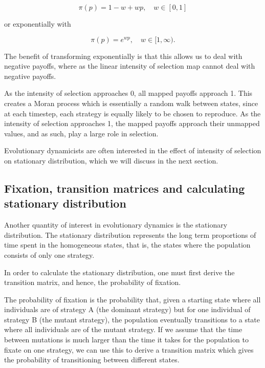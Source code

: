 \begin{equation*}
    \pi(p) = 1 - w + wp, \quad w \in [0,1]
\end{equation*}

or exponentially with

\begin{equation*}
    \pi(p) = e^{wp}, \quad w \in [1, \infty).
\end{equation*}

The benefit of transforming exponentially is that this allows us to deal with negative payoffs, where as the linear intensity of selection map cannot deal with negative payoffs.

As the intensity of selection approaches 0, all mapped payoffs approach 1.
This creates a Moran process which is essentially a random walk between states, since at each timestep, each strategy is equally likely to be chosen to reproduce.
As the intensity of selection approaches 1, the mapped payoffs approach their unmapped values, and as such, play a large role in selection.

Evolutionary dynamicists are often interested in the effect of intensity of selection on stationary distribution, which we will discuss in the next section.

\subsection{Fixation, transition matrices and calculating stationary distribution}

Another quantity of interest in evolutionary dynamics is the stationary distribution.
The stationary distribution represents the long term proportions of time spent in the homogeneous states, that is, the states where the population consists of only one strategy.

In order to calculate the stationary distribution, one must first derive the transition matrix, and hence, the probability of fixation.

The probability of fixation is the probability that, given a starting state where all individuals are of strategy A (the dominant strategy) but for one individual of strategy B (the mutant strategy), the population eventually transitions to a state where all individuals are of the mutant strategy.
If we assume that the time between mutations is much larger than the time it takes for the population to fixate on one strategy, we can use this to derive a transition matrix which gives the probability of transitioning between different states.


